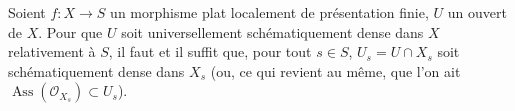 \begin{proposition}[11.10.10]
\label{IV.11.10.10-fr}
Soient $f:X\to S$ un morphisme plat localement de présentation finie, $U$ un
ouvert de $X$. Pour que $U$ soit universellement schématiquement dense dans
$X$ relativement à $S$, il faut et il suffit que, pour tout $s\in S$,
$U_s=U\cap X_s$ soit schématiquement dense dans $X_s$ (ou, ce qui revient au
même, que l'on ait $\operatorname{Ass}(\mathcal O_{X_s})\subset U_s$).
\end{proposition}

